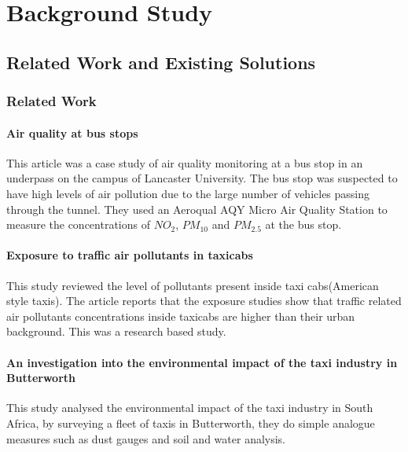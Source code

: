 \chapter{Background Study}



\section{Related Work and Existing Solutions}
\subsection{Related Work}

\subsubsection{Air quality at bus stops \cite{busstop}}
This article was a case study of air quality monitoring at a bus stop in an underpass on the campus of Lancaster University. The bus stop was suspected to have high levels of air pollution due to the large number of vehicles passing through the tunnel. They used an Aeroqual AQY Micro Air Quality Station to measure the concentrations of $NO_2$, $PM_{10}$ and $PM_{2.5}$ at the bus stop. 


\subsubsection{Exposure to traffic air pollutants in taxicabs \cite{insidetaxismall}}
This study reviewed the level of pollutants present inside taxi cabs(American style taxis). The article reports that the exposure studies show that traffic related air pollutants concentrations inside taxicabs are higher than their urban background. This was a research based study.

\subsubsection{An investigation into the environmental impact of the taxi industry in Butterworth \cite{Environmentalimpact}}
This study analysed the environmental impact of the taxi industry in South Africa, by surveying a fleet of taxis in Butterworth, they do simple analogue measures such as dust gauges and soil and water analysis. 


